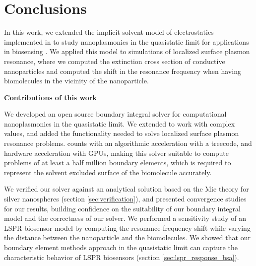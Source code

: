 \chapter{Conclusions}

In this work, we extended the implicit-solvent model of electrostatics implemented in \pygbe \cite{CooperClementiBarba2015}
to study nanoplasmonics in the quasistatic limit for applications in biosensing \cite{ClementiETal2017, ClementiETal2019}.
We applied this model to simulations of localized surface plasmon resonance, where we computed the extinction cross section of 
conductive nanoparticles and computed the shift in the resonance frequency when having biomolecules in the vicinity of the 
nanoparticle.

\textbf{Contributions of this work}

We developed an open source boundary integral solver for computational nanoplasmonics in the quasistatic limit. We extended \pygbe to work 
with complex values, and added the functionality needed to solve localized surface plasmon resonance problems. \pygbe 
counts with an algorithmic acceleration with a treecode, and hardware acceleration with GPUs, making this solver 
suitable to compute problems of at least a half million boundary elements, which is required to represent the solvent excluded 
surface of the biomolecule accurately.

We verified our solver against an analytical solution based on the Mie theory for silver nanospheres (section \ref{sec:verification}), and 
presented convergence studies for our results, building confidence on the suitability of our boundary integral model and the  
correctness of our solver. We performed a sensitivity study of an LSPR biosensor model by computing the resonance-frequency shift
while varying the distance between the nanoparticle and the biomolecules. We showed that our boundary element methods approach in
the quasistatic limit can capture the characteristic behavior of LSPR biosensors (section \ref{sec:lspr_response_bsa}).

